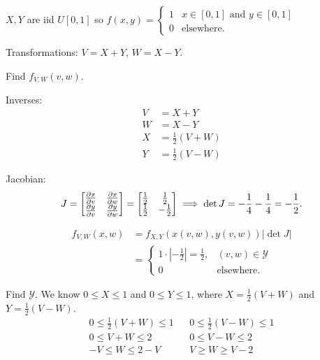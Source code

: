 \documentclass[10pt, a4paper]{article}
\begin{document}
\begin{example}
    $X, Y$ are iid $U[0, 1]$ so $f(x, y) = \begin{cases}
        1 & x \in [0, 1]\text{ and } y \in [0, 1] \\
        0 &\text{elsewhere}.
    \end{cases}$

    Transformations:
    $V = X + Y$,
    $W = X - Y$.

    Find $f_{V, W}(v, w)$.

    \begin{solution}
        Inverses:
        \begin{align*}
            V &= X + Y \\
            W &= X - Y \\
            X &= \frac{1}{2}(V + W) \\
            Y &= \frac{1}{2}(V - W)
        \end{align*}

        Jacobian:
        \[
        J = \begin{bmatrix}
            \pd[x]{v} & \pd[x]{w} \\
            \pd[y]{v} & \pd[y]{w}
        \end{bmatrix} = \begin{bmatrix}
            \frac{1}{2} & \frac{1}{2} \\ \frac{1}{2} & -\frac{1}{2}
        \end{bmatrix} \implies \det{J} = -\frac{1}{4} - \frac{1}{4} = -\frac{1}{2}.
        \]

        \begin{align*}
            f_{V, W}(x, w) &= f_{X, Y}(x(v, w), y(v, w))|\det{J}| \\
            &= \begin{cases}
                1 \cdot \left|-\frac{1}{2}\right| = \frac{1}{2}, &(v, w) \in \mathcal{Y} \\
                0 &\text{elsewhere}.
            \end{cases}
        \end{align*}
        
        Find $\mathcal{Y}$.
        We know $0 \leq X \leq 1$ and $0 \leq Y \leq 1$,
        where $X = \frac{1}{2}(V + W)$ and $Y = \frac{1}{2}(V - W)$.
        \begin{align*}
            0 \leq \frac{1}{2}(V + W) \leq 1 && 0 \leq \frac{1}{2}(V - W) \leq 1 \\
            0 \leq V + W \leq 2 && 0 \leq V - W \leq 2 \\
            -V \leq W \leq 2 - V && V \geq W \geq V - 2
        \end{align*}
    \end{solution}
\end{example}
\end{document}
